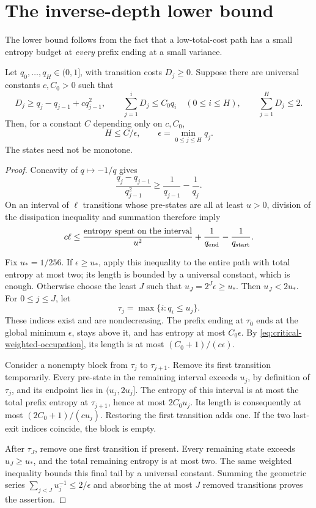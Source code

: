 \section{The inverse-depth lower bound}
\label{sec:critical-sharp-lower}

The lower bound follows from the fact that a low-total-cost path has
a small entropy budget at \emph{every} prefix ending at a small variance.

\begin{lemma}
\label{lem:critical-last-exit}
Let $q_0,\ldots,q_H\in(0,1]$, with transition costs $D_j\ge0$.
Suppose there are universal constants $c,C_0>0$ such that
\[
 D_j\ge q_j-q_{j-1}+cq_{j-1}^2,
 \qquad \sum_{j=1}^{i}D_j\le C_0q_i\quad(0\le i\le H),
 \qquad \sum_{j=1}^H D_j\le2.
\]
Then, for a constant $C$ depending only on $c,C_0$,
\[
 H\le C/\epsilon,\qquad \epsilon=\min_{0\le j\le H}q_j.
\]
The states need not be monotone.
\end{lemma}

\begin{proof}
Concavity of $q\mapsto-1/q$ gives
\[
 \frac{q_j-q_{j-1}}{q_{j-1}^2}
 \ge\frac1{q_{j-1}}-\frac1{q_j}.
\]
On an interval of $\ell$ transitions whose pre-states are all at least
$u>0$, division of the dissipation inequality and summation therefore
imply
\begin{equation}\label{eq:critical-weighted-occupation}
 c\ell\le\frac{\text{entropy spent on the interval}}{u^2}
              +\frac1{q_{\rm end}}-\frac1{q_{\rm start}}.
\end{equation}

Fix $u_*=1/256$. If $\epsilon\ge u_*$, apply this inequality to
the entire path with total entropy at most two; its length is bounded
by a universal constant, which is enough. Otherwise choose the least
$J$ such that $u_J=2^J\epsilon\ge u_*$. Then
$u_J<2u_*$. For $0\le j\le J$, let
\[
 \tau_j=\max\{i:q_i\le u_j\}.
\]
These indices exist and are nondecreasing. The prefix ending at
$\tau_0$ ends at the global minimum $\epsilon$, stays above it,
and has entropy at most $C_0\epsilon$. By
\eqref{eq:critical-weighted-occupation}, its length is at most
$(C_0+1)/(c\epsilon)$.

Consider a nonempty block from $\tau_j$ to $\tau_{j+1}$.
Remove its first transition temporarily. Every pre-state in the
remaining interval exceeds $u_j$, by definition of $\tau_j$, and
its endpoint lies in $(u_j,2u_j]$. The entropy of this interval is
at most the total prefix entropy at $\tau_{j+1}$, hence at most
$2C_0u_j$. Its length is consequently at most
$(2C_0+1)/(cu_j)$. Restoring the first transition adds one.
If the two last-exit indices coincide, the block is empty.

After $\tau_J$, remove one first transition if present. Every remaining
state exceeds $u_J\ge u_*$, and the total remaining entropy is at most
two. The same weighted inequality bounds this final tail by a universal
constant. Summing the geometric series
$\sum_{j<J}u_j^{-1}\le2/\epsilon$ and absorbing the at most $J$
removed transitions proves the assertion.
\end{proof}

